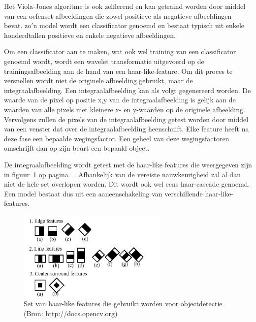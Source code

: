 	\par Het Viola-Jones algoritme is ook zelflerend en kan getraind worden door middel van een oefenset afbeeldingen die zowel positieve als negatieve afbeeldingen bevat. zo$'$n model wordt een classificator genoemd en bestaat typisch uit enkele honderdtallen positieve en enkele negatieve afbeeldingen.

	\par Om een classificator aan te maken, wat ook wel training van een classificator genoemd wordt, wordt een wavelet transformatie uitgevoerd op de trainingsafbeelding aan de hand van een haar-like-feature. Om dit proces te versnellen wordt niet de originele afbeelding gebruikt, maar de integraalafbeelding. Een integraalafbeelding kan als volgt gegenereerd worden. De waarde van de pixel op positie x,y van de integraalafbeelding is gelijk aan de waarden van alle pixels met kleinere x- en y-waarden op de originele afbeelding. Vervolgens zullen de pixels van de integraalafbeelding getest worden door middel van een venster dat over de integraalafbeelding heenschuift. Elke feature heeft na deze fase een bepaalde wegingsfactor. Een geheel van deze wegingsfactoren omschrijft dan op zijn beurt een bepaald object.

	\par De integraalafbeelding wordt getest met de haar-like features die weergegeven zijn in figuur~\ref{fig:HaarFeatureImage} op pagina ~\pageref{fig:HaarFeatureImage}. Afhankelijk van de vereiste nauwkeurigheid zal al dan niet de hele set overlopen worden. Dit wordt ook wel eens haar-cascade genoemd. Een model bestaat dus uit een aaneenschakeling van verschillende haar-like-features. 

		\begin{figure}[H]
			\centering
			\includegraphics[width=0.65\textwidth]{Chapters/Chapter3/Images/haarfeatures.png}
			\caption{Set van haar-like features die gebruikt worden voor objectdetectie (Bron: http://docs.opencv.org)}
			\label{fig:HaarFeatureImage}
		\end{figure}

